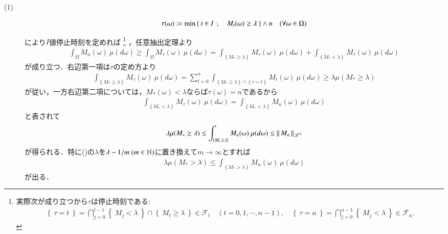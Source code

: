 	\begin{prf}\mbox{}
		\begin{description}
			\item[(1)] 
				\begin{align}
					\tau(\omega) \coloneqq \operatorname*{min}_{} \left\{\ t \in I\ \, ; \quad M_t(\omega) \geq \lambda\ \right\} \wedge n \quad (\forall \omega \in \Omega)
				\end{align}
				により$I$値停止時刻を定めれば
				\footnote{
					実際次が成り立つから$\tau$は停止時刻である:
					\begin{align}
						\left\{\ \tau = t\ \right\} = \bigcap_{j=0}^{t-1} \left\{\ M_j < \lambda\ \right\} \cap \left\{\ M_t \geq \lambda\ \right\} \in \mathcal{F}_t
						\quad (t=0,1,\cdots,n-1), \quad
						\left\{\ \tau = n\ \right\} = \bigcap_{j=0}^{n-1} \left\{\ M_j < \lambda\ \right\} \in \mathcal{F}_n.
					\end{align}
				}
				，任意抽出定理より
				\begin{align}
					\int_{\Omega} M_n(\omega)\ \mu(d\omega)
					\geq \int_{\Omega} M_\tau(\omega)\ \mu(d\omega)
					= \int_{\left\{M_* \geq \lambda\right\}} M_\tau(\omega)\ \mu(d\omega) 
						+ \int_{\left\{M_* < \lambda\right\}} M_\tau(\omega)\ \mu(d\omega)
				\end{align}
				が成り立つ．右辺第一項は$\tau$の定め方より
				\begin{align}
					\int_{\left\{M_* \geq \lambda\right\}} M_\tau(\omega)\ \mu(d\omega) 
					= \sum_{t=0}^{n} \int_{\left\{M_* \geq \lambda\right\} \cap \left\{\tau = t\right\}} M_t(\omega)\ \mu(d\omega)
					\geq \lambda \mu( M_* \geq \lambda )
				\end{align}
				が従い，一方右辺第二項については，$M_*(\omega) < \lambda$ならば$\tau(\omega) = n$であるから
				\begin{align}
					\int_{\left\{M_* < \lambda\right\}} M_\tau(\omega)\ \mu(d\omega) = \int_{\left\{M_* < \lambda\right\}} M_n(\omega)\ \mu(d\omega) 
				\end{align}
				と表されて
				\begin{align}
					\lambda \mu( M_* \geq \lambda ) \leq 
					\int_{\left\{M_* \geq \lambda\right\}} M_n(\omega)\ \mu(d\omega) \leq \Norm{M_n}{\mathscr{L}^1} \label{Doob_ineq_1}
				\end{align}
				が得られる．特に()の$\lambda$を$\lambda - 1/m\ (m \in \mathbb{N})$に置き換えて$m \longrightarrow \infty$とすれば
				\begin{align}
					\lambda \mu( M_* > \lambda ) \leq \int_{\left\{M_* > \lambda\right\}} M_n(\omega)\ \mu(d\omega) \label{Doob_ineq_2}
				\end{align}
				が出る．
			

\end{description}
\end{prf}
